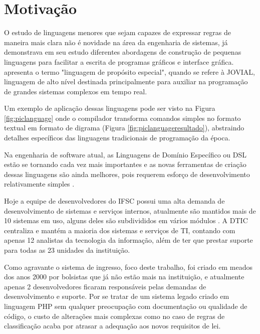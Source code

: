 \section{Motivação}
\label{motivacao}

O estudo de linguagens menores que sejam capazes de expressar regras de maneira mais clara não é novidade na área da engenharia de sistemas,  já demonstrava em seu estudo diferentes abordagens de construção de pequenas linguagens para facilitar a escrita de programas gráficos e interface gráfica.  apresenta o termo "linguagem de propósito especial", quando se refere à \gls{JOVIAL}, linguagem de alto nível destinada principalmente para auxiliar na programação de grandes sistemas complexos em tempo real. 

Um exemplo de aplicação dessas linguagens pode ser visto na Figura \ref{fig:piclanguage} onde o compilador transforma comandos simples no formato textual em formato de digrama (Figura \ref{fig:piclanguageresultado}), abstraindo detalhes específicos das linguagens tradicionais de programação da época.





Na engenharia de software atual, as Linguagens de Domínio Específico ou \gls{DSL} estão se tornando cada vez mais importantes e as novas ferramentas de criação dessas linguagens são ainda melhores, pois requerem esforço de desenvolvimento relativamente simples \cite{dslengineering}.


Hoje a equipe de desenvolvedores do \gls{IFSC} possui uma alta demanda de desenvolvimento de sistemas e serviços internos, atualmente são mantidos mais de 10 sistemas em uso, alguns deles são subdivididos em vários módulos \cite{catalogoifsc}. A \gls{DTIC} centraliza e mantém a maioria dos sistemas e serviços de TI, contando com apenas 12 analistas da tecnologia da informação, além de ter que prestar suporte para todas as 23 unidades da instituição. 

Como agravante o sistema de ingresso, foco deste trabalho, foi criado em meados dos anos 2000 por bolsistas que já não estão mais na instituição, e atualmente apenas 2 desenvolvedores ficaram responsáveis pelas demandas de desenvolvimento e suporte. Por se tratar de um sistema legado criado em linguagem PHP sem qualquer preocupação com documentação ou qualidade de código, o custo de alterações mais complexas como no caso de regras de classificação acaba por atrasar a adequação aos novos requisitos de lei. 


